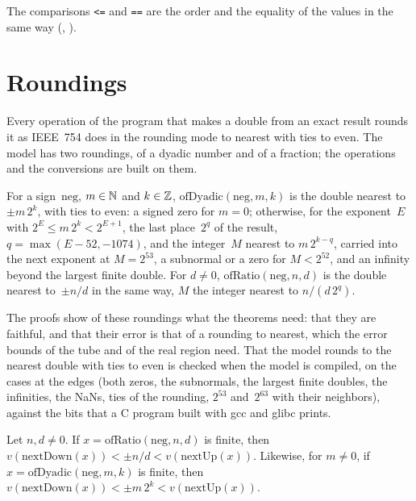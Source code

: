 The comparisons \texttt{<=} and \texttt{==} are the order and the equality of the values in the same
way (, ).

\section{Roundings}\label{sec:rounding}

Every operation of the program that makes a double from an exact result rounds it as IEEE~754 does
in the rounding mode to nearest with ties to even. The model has two roundings, of a dyadic number
and of a fraction; the operations and the conversions are built on them.

\begin{definition}\label{def:Double.ofDyadic}
  \leanok
  For a sign~$\mathrm{neg}$, $m \in \mathbb{N}$ and $k \in \mathbb{Z}$, $\mathrm{ofDyadic}(\mathrm{neg}, m, k)$ is
  the double nearest to~$\pm m\,2^k$, with ties to even: a signed zero for $m = 0$; otherwise, for
  the exponent~$E$ with $2^E \le m\,2^k < 2^{E+1}$, the last place~$2^q$ of the result,
  $q = \max(E - 52, -1074)$, and the integer~$M$ nearest to $m\,2^{k - q}$, carried into the next
  exponent at $M = 2^{53}$, a subnormal or a zero for $M < 2^{52}$, and an infinity beyond the
  largest finite double. For $d \ne 0$, $\mathrm{ofRatio}(\mathrm{neg}, n, d)$ is the double nearest
  to~$\pm n/d$ in the same way, $M$ the integer nearest to $n/(d\,2^q)$.
\end{definition}

The proofs show of these roundings what the theorems need: that they are faithful, and that their
error is that of a rounding to nearest, which the error bounds of the tube and of the real region
need. That the model rounds to the nearest
double with ties to even is checked when the model is compiled, on the cases at the edges (both
zeros, the subnormals, the largest finite doubles, the infinities, the NaNs, ties of the rounding,
$2^{53}$ and~$2^{63}$ with their neighbors), against the bits that a C program built with gcc and
glibc prints.

\begin{lemma}\label{lem:Double.lt_nextUp_and_nextDown_lt_ofRatio}
  \leanok
  Let $n, d \ne 0$. If $x = \mathrm{ofRatio}(\mathrm{neg}, n, d)$ is finite, then
  $v(\mathrm{nextDown}(x)) < \pm n/d < v(\mathrm{nextUp}(x))$. Likewise, for $m \ne 0$, if
  $x = \mathrm{ofDyadic}(\mathrm{neg}, m, k)$ is finite, then
  $v(\mathrm{nextDown}(x)) < \pm m\,2^k < v(\mathrm{nextUp}(x))$.
\end{lemma}

